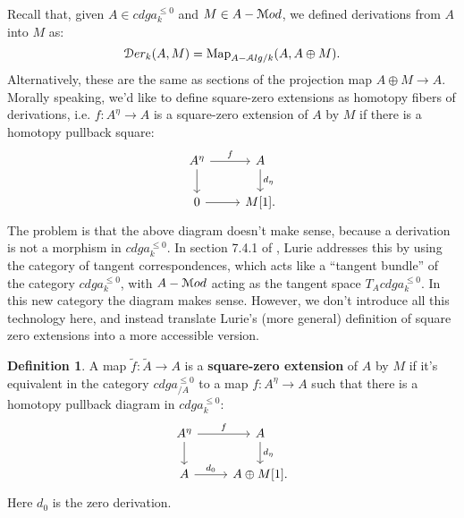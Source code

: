\documentclass[10pt,a4paper,reqno,oneside]{book} %
\theoremstyle{plain}
\theoremstyle{definition}
\newtheorem{defin}[thm]{Definition}
\theoremstyle{remark}
\numberwithin{equation}{section}
\begin{document}
Recall that, given $A \in cdga^{\leq 0}_k$ and $M \in A-\mathcal M od$, we defined derivations from $A$ into $M$ as:
\[	\mathcal D er_k(A,M) = \operatorname{Map}_{A-\mathcal A lg / k} (A, A \oplus M) .	\]
Alternatively, these are the same as sections of the projection map $A \oplus M \to A$. Morally speaking, we'd
like to define square-zero extensions as homotopy fibers of derivations, i.e. $f: A^{\eta} \to A$ is a square-zero
extension of $A$ by $M$ if there is a homotopy pullback square:
\[
\begin{tikzcd}
A^{\eta}\arrow{r}{f}\arrow{d} & A\arrow{d}{d_{\eta}} \\
0\arrow{r} & M[1].
\end{tikzcd}
\]
The problem is that the above diagram doesn't make sense, because a derivation is not a morphism in $cdga^{\leq 0}_k$.
In section 7.4.1 of \cite{Lurie_Higher_algebra}, Lurie addresses this by using the category of tangent 
correspondences, which acts
like a ``tangent bundle'' of the category $cdga^{\leq 0}_k$, with $A-\mathcal M od$ acting as the tangent space 
$T_A cdga^{\leq 0}_k$. In this new category
the diagram makes sense. However, we don't introduce all this technology here, and instead translate Lurie's (more general)
definition of square zero extensions into a more accessible version.

\begin{defin}
\label{defin:sq0}
A map $\tilde f: \tilde A \to A$ is a \textbf{square-zero extension} of $A$ by $M$ if it's equivalent in the category
$cdga^{\leq 0}_{/A}$ to a map $f: A^{\eta} \to A$ such that there is a homotopy pullback diagram in $cdga^{\leq 0}_k$:
\[
\begin{tikzcd}
A^{\eta}\arrow{r}{f} \arrow{d} & A\arrow{d}{d_{\eta}} \\
A\arrow{r}{d_0} & A \oplus M[1].
\end{tikzcd}
\]
Here $d_0$ is the zero derivation.
\end{defin}
\end{document}
